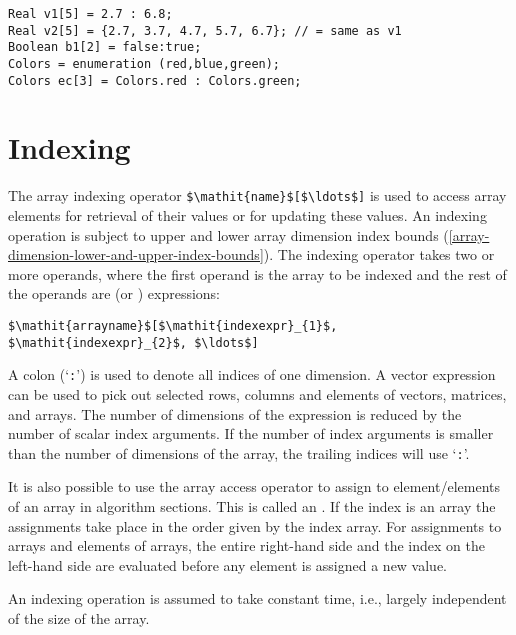 \begin{example}
\begin{lstlisting}[language=modelica]
Real v1[5] = 2.7 : 6.8;
Real v2[5] = {2.7, 3.7, 4.7, 5.7, 6.7}; // = same as v1
Boolean b1[2] = false:true;
Colors = enumeration (red,blue,green);
Colors ec[3] = Colors.red : Colors.green;
\end{lstlisting}
\end{example}

\section{Indexing}\label{array-indexing}\label{indexing}

The array indexing operator \lstinline!$\mathit{name}$[$\ldots$]! is used to access array elements for retrieval of their values or for updating these values.
An indexing operation is subject to upper and lower array dimension index bounds (\cref{array-dimension-lower-and-upper-index-bounds}).
The indexing operator takes two or more operands, where the first operand is the array to be indexed and the rest of the operands are  (or ) expressions:

\lstinline!$\mathit{arrayname}$[$\mathit{indexexpr}_{1}$, $\mathit{indexexpr}_{2}$, $\ldots$]!

A colon (`\lstinline!:!') is used to denote all indices of one dimension.
A vector expression can be used to pick out selected rows, columns and elements of vectors, matrices, and arrays.
The number of dimensions of the expression is reduced by the number of scalar index arguments.
If the number of index arguments is smaller than the number of dimensions of the array, the trailing indices will use `\lstinline!:!'.

It is also possible to use the array access operator to assign to element/elements of an array in algorithm sections.
This is called an .
If the index is an array the assignments take place in the order given by the index array.
For assignments to arrays and elements of arrays, the entire right-hand side and the index on the left-hand side are evaluated before any element is assigned a new value.

\begin{nonnormative}
An indexing operation is assumed to take constant time, i.e., largely independent of the size of the array.
\end{nonnormative}

